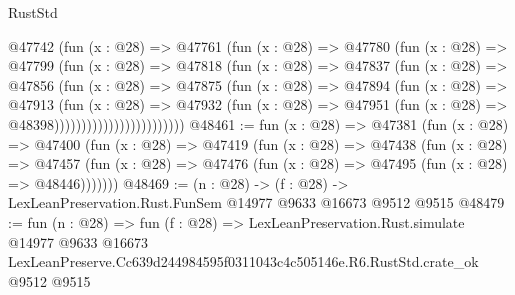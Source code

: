 \begin{lexlean}{RustStd}
\begin{coremodule}
                          @47742
                            (fun (x : @28) =>
                            @47761
                              (fun (x : @28) =>
                              @47780
                                (fun (x : @28) =>
                                @47799
                                  (fun (x : @28) =>
                                  @47818
                                    (fun (x : @28) =>
                                    @47837
                                      (fun (x : @28) =>
                                      @47856
                                        (fun (x : @28) =>
                                        @47875
                                          (fun (x : @28) =>
                                          @47894
                                            (fun (x : @28) =>
                                            @47913
                                              (fun (x : @28) =>
                                              @47932
                                                (fun (x : @28) =>
                                                @47951
                                                  (fun (x : @28) => @48398))))))))))))))))))))))))
@48461 := fun (x : @28) =>
  @47381
    (fun (x : @28) =>
    @47400
      (fun (x : @28) =>
      @47419
        (fun (x : @28) =>
        @47438
          (fun (x : @28) =>
          @47457 (fun (x : @28) => @47476 (fun (x : @28) => @47495 (fun (x : @28) => @48446)))))))
@48469 := (n : @28) -> (f : @28) -> LexLeanPreservation.Rust.FunSem @14977 @9633 @16673 @9512 @9515
@48479 := fun (n : @28) =>
  fun (f : @28) =>
  LexLeanPreservation.Rust.simulate
    @14977
    @9633
    @16673
    LexLeanPreserve.Cc639d244984595f0311043c4c505146e.R6.RustStd.crate_ok
    @9512
    @9515
\end{coremodule}
\end{lexlean}
